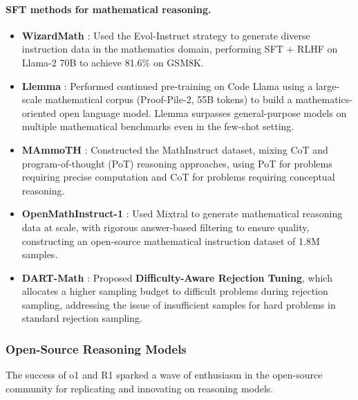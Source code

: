 \paragraph{SFT methods for mathematical reasoning.}
\begin{itemize}[leftmargin=2em]
  \item \textbf{WizardMath} \cite{luo2023wizardmath}:
    Used the Evol-Instruct strategy to generate diverse instruction data in the mathematics domain,
    performing SFT + RLHF on Llama-2 70B to achieve 81.6\% on GSM8K.

  \item \textbf{Llemma} \cite{azerbayev2023llemma}:
    Performed continued pre-training on Code Llama using a large-scale mathematical corpus (Proof-Pile-2, 55B tokens)
    to build a mathematics-oriented open language model.
    Llemma surpasses general-purpose models on multiple mathematical benchmarks even in the few-shot setting.

  \item \textbf{MAmmoTH} \cite{yue2023mammoth}:
    Constructed the MathInstruct dataset, mixing CoT and program-of-thought (PoT) reasoning approaches,
    using PoT for problems requiring precise computation and CoT for problems requiring conceptual reasoning.

  \item \textbf{OpenMathInstruct-1} \cite{toshniwal2024openmath}:
    Used Mixtral to generate mathematical reasoning data at scale, with rigorous answer-based filtering to ensure quality,
    constructing an open-source mathematical instruction dataset of 1.8M samples.

  \item \textbf{DART-Math} \cite{tong2024dartmath}:
    Proposed \textbf{Difficulty-Aware Rejection Tuning},
    which allocates a higher sampling budget to difficult problems during rejection sampling,
    addressing the issue of insufficient samples for hard problems in standard rejection sampling.
\end{itemize}

\subsubsection{Open-Source Reasoning Models}

The success of o1 and R1 sparked a wave of enthusiasm in the open-source community for replicating and innovating on reasoning models.

